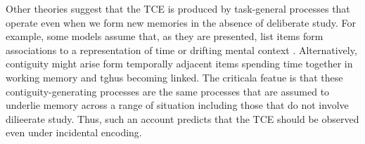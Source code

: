 \documentclass[man,natbib,floatsintext]{apa6} %
\begin{document}
Other theories suggest that the TCE is produced by task-general processes that operate even when we form new memories in the absence of deliberate study. For example, some models assume that, as they are presented, list items form associations to a representation of time \citep{HowaEtal14a,BrowEtal07} or drifting mental context \citep{LohnEtal14}. Alternatively, contiguity might arise form temporally adjacent items spending time together in working memory and tghus becoming linked. The criticala featue is that these contiguity-generating processes are the same processes that are assumed to underlie memory across a range of situation including those that do not involve dilieerate study. Thus, such an account  predicts that the TCE should be observed even under incidental encoding.















\end{document}
